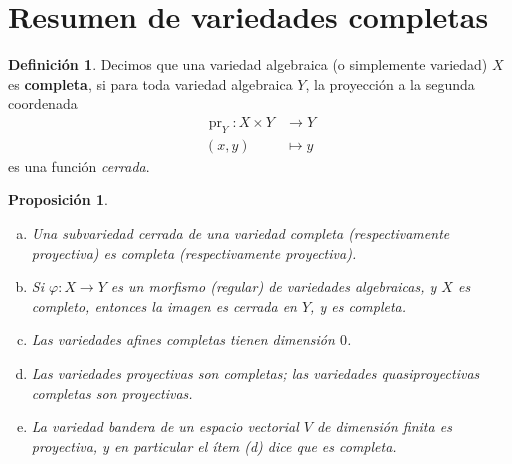 \documentclass[spanish,10pt]{amsart}
\newtheorem{proposition}[theorem]{Proposición}
\theoremstyle{definition}
\newtheorem{definition}[theorem]{Definición}
\theoremstyle{remark}
\numberwithin{equation}{section}
\begin{document}
\section{Resumen de variedades completas}

\begin{definition}
Decimos que una variedad algebraica (o simplemente variedad) $X$ es \textbf{completa}, si para toda variedad algebraica $Y$, la proyección a la segunda coordenada
\begin{align*}
\operatorname{pr}_Y : X \times Y &\longrightarrow Y \\
(x,y) &\longmapsto y
\end{align*}
es una función \textit{cerrada}.
\end{definition}

\begin{proposition}\label{proposicion:varios hechos sobre variedades completas}
\begin{enumerate}[(a)]
\item Una subvariedad cerrada de una variedad completa (respectivamente proyectiva) es completa (respectivamente proyectiva).
\item Si $\varphi : X \to Y$ es un morfismo (regular) de variedades algebraicas, y $X$ es completo, entonces la imagen es cerrada en $Y$, y es completa.
\item Las variedades afines completas tienen dimensión $0$.
\item Las variedades proyectivas son completas; las variedades quasiproyectivas completas son proyectivas.
\item La \textit{variedad bandera} de un espacio vectorial $V$ de dimensión finita es proyectiva, y en particular el ítem (d) dice que es completa.
\end{enumerate}
\end{proposition}
\end{document}
